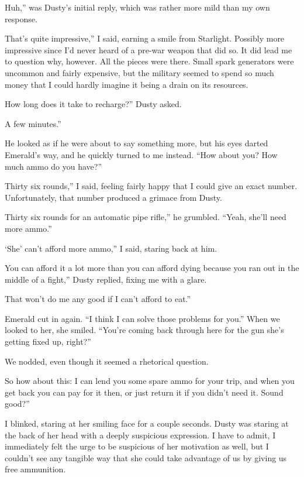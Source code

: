 \leavevmode{}Huh,” was Dusty’s initial reply, which was rather more mild than my own response.

\leavevmode{}That’s quite impressive,” I said, earning a smile from Starlight. Possibly more impressive since I’d never heard of a pre-war weapon that did so. It did lead me to question why, however. All the pieces were there. Small spark generators were uncommon and fairly expensive, but the military seemed to spend so much money that I could hardly imagine it being a drain on its resources.

\leavevmode{}How long does it take to recharge?” Dusty asked.

\leavevmode{}A few minutes.”

He looked as if he were about to say something more, but his eyes darted Emerald’s way, and he quickly turned to me instead. “How about you? How much ammo do you have?”

\leavevmode{}Thirty six rounds,” I said, feeling fairly happy that I could give an exact number. Unfortunately, that number produced a grimace from Dusty.

\leavevmode{}Thirty six rounds for an automatic pipe rifle,” he grumbled. “Yeah, she’ll need more ammo.”

\leavevmode{}‘She’ can’t afford more ammo,” I said, staring back at him.

\leavevmode{}You can afford it a lot more than you can afford dying because you ran out in the middle of a fight,” Dusty replied, fixing me with a glare.

\leavevmode{}That won’t do me any good if I can’t afford to eat.”

Emerald cut in again. “I think I can solve those problems for you.” When we looked to her, she smiled. “You’re coming back through here for the gun she’s getting fixed up, right?”

We nodded, even though it seemed a rhetorical question.

\leavevmode{}So how about this: I can lend you some spare ammo for your trip, and when you get back you can pay for it then, or just return it if you didn’t need it. Sound good?”

I blinked, staring at her smiling face for a couple seconds. Dusty was staring at the back of her head with a deeply suspicious expression. I have to admit, I immediately felt the urge to be suspicious of her motivation as well, but I couldn’t see any tangible way that she could take advantage of us by giving us free ammunition.

